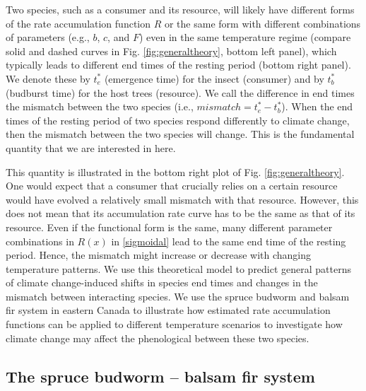 \documentclass[12 pt]{article}
\begin{document}
Two species, such as a consumer and its resource, will likely have different forms of the rate accumulation function $R$ or the same form with different combinations of parameters (e.g., $b$, $c$, and $F$) even in the same temperature regime (compare solid and dashed curves in Fig. \ref{fig:generaltheory}, bottom left panel), which typically leads to different end times of the resting period (bottom right panel). We denote these by $t_e ^*$ (emergence time) for the insect (consumer) and by $t_b ^*$ (budburst time) for the host trees (resource). We call the difference in end times the mismatch between the two species (i.e., $mismatch=t_e ^*-t_b ^*$). When the end times of the resting period of two species respond differently to climate change, then the mismatch between the two species will change. This is the fundamental quantity that we are interested in here. \par
This quantity is illustrated in the bottom right plot of Fig. \ref{fig:generaltheory}. One would expect that a consumer that crucially relies on a certain resource would have evolved a relatively small mismatch with that resource. However, this does not mean that its accumulation rate curve has to be the same as that of its resource. Even if the functional form is the same, many different parameter combinations in $R(x)$ in \ref{sigmoidal} lead to the same end time of the resting period. Hence, the mismatch might increase or decrease with changing temperature patterns. We use this theoretical model to predict general patterns of climate change-induced shifts in species end times and changes in the mismatch between interacting species. We use the spruce budworm and balsam fir system in eastern Canada to illustrate how estimated rate accumulation functions can be applied to different temperature scenarios to investigate how climate change may affect the phenological between these two species.

\subsection{The spruce budworm – balsam fir system} 
\end{document}
